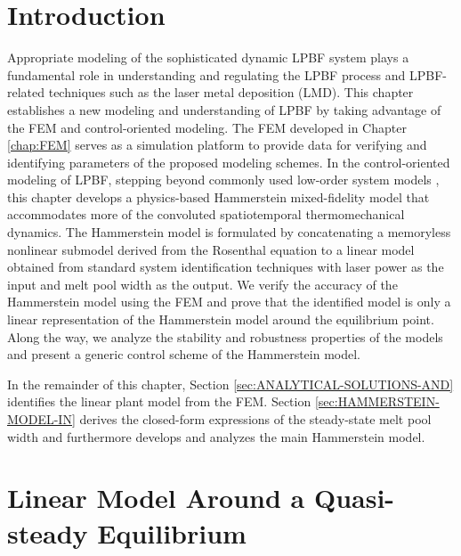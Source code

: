 \documentclass [11pt, proquest] {uwthesis}[2020/02/24]
\begin{document}
\section{Introduction}

Appropriate modeling of the sophisticated
dynamic LPBF system plays a fundamental role in understanding and regulating
the LPBF process and LPBF-related techniques such as the laser metal deposition (LMD). This chapter establishes a new modeling and understanding of LPBF by
taking advantage of the FEM and control-oriented modeling. The FEM developed in Chapter \ref{chap:FEM} serves as a simulation platform to provide data for verifying and identifying
parameters of the proposed modeling schemes. In the control-oriented
modeling of LPBF, stepping beyond commonly used low-order system models  \cite{kruth2007feedback,craeghs2010feedback,zheng2020distributed,song2011feedback,cao2015control,sammons2014repetitive}, this chapter develops a physics-based Hammerstein mixed-fidelity model that accommodates
more of the convoluted spatiotemporal thermomechanical dynamics. The
Hammerstein model is formulated by concatenating a memoryless nonlinear
submodel derived from the Rosenthal equation to a linear model obtained
from standard system identification techniques with laser power as
the input and melt pool width as the output. We verify the accuracy
of the Hammerstein model using the FEM and prove that the identified
model is only a linear representation of the Hammerstein model around
the equilibrium point. Along the way, we analyze the stability and
robustness properties of the models and present a generic control
scheme of the Hammerstein model.

In the remainder of this chapter, Section \ref{sec:ANALYTICAL-SOLUTIONS-AND}
identifies the linear plant model from the FEM. Section \ref{sec:HAMMERSTEIN-MODEL-IN}
derives the closed-form expressions of the steady-state melt pool
width and furthermore develops and analyzes the main Hammerstein model.

\section{\label{sec:ANALYTICAL-SOLUTIONS-AND}Linear Model Around a Quasi-steady Equilibrium}
\end{document}
